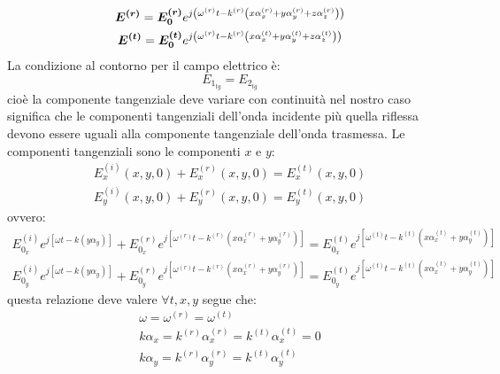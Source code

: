 \begin{subequations}
  \begin{gather}
    \boldsymbol{E^{(r)}}=\boldsymbol{E^{(r)}_0}e^{j\left(\omega^{(r)} t-k^{(r)}\left(x\alpha^{(r)}_x+y\alpha^{(r)}_y+z\alpha^{(r)}_z\right)\right)}\\
    \boldsymbol{E^{(t)}}=\boldsymbol{E^{(t)}_0}e^{j\left(\omega^{(r)} t-k^{(r)}\left(x\alpha^{(t)}_x+y\alpha^{(t)}_y+z\alpha^{(t)}_z\right)\right)}
  \end{gather}
\end{subequations}
La condizione al contorno per il campo elettrico è:
\begin{equation}
  E_{1_{tg}}=E_{2_{tg}}
\end{equation}
cioè la componente tangenziale deve variare con continuità nel nostro caso significa che le componenti tangenziali dell'onda incidente più quella riflessa devono essere uguali alla componente tangenziale dell'onda trasmessa. Le componenti tangenziali sono le componenti $x$ e $y$:
\begin{subequations}
  \begin{gather}
    E_x^{(i)}(x,y,0)+E_x^{(r)}(x,y,0)=E_x^{(t)}(x,y,0)\\
    E_y^{(i)}(x,y,0)+E_y^{(r)}(x,y,0)=E_y^{(t)}(x,y,0)
  \end{gather}
\end{subequations}
ovvero:
\begin{subequations}
  \begin{gather}
    E^{(i)}_{0_x}e^{j\left[\omega t-k\left(y\alpha_y\right)\right]}+E^{(r)}_{0_x}e^{j\left[\omega^{(r)} t-k^{(r)}(x\alpha_x^{(r)}+y\alpha_y^{(r)})\right]}=E^{(t)}_{0_x}e^{j\left[\omega^{(t)} t-k^{(t)}(x\alpha_x^{(t)}+y\alpha_y^{(t)})\right]}\\
    E^{(i)}_{0_y}e^{j\left[\omega t-k\left(y\alpha_y\right)\right]}+E^{(r)}_{0_y}e^{j\left[\omega^{(r)} t-k^{(r)}(x\alpha_x^{(r)}+y\alpha_y^{(r)})\right]}=E^{(t)}_{0_y}e^{j\left[\omega^{(t)} t-k^{(t)}(x\alpha_x^{(t)}+y\alpha_y^{(t)})\right]}
  \end{gather}
  \label{tante_ottica01}
\end{subequations}
questa relazione deve valere $\forall t,x,y$ segue che:
\begin{subequations}
  \begin{gather}
    \label{ottica_frequenze01}
    \omega=\omega^{(r)}=\omega^{(t)}\\
    \label{ottica_normali01}
    k\alpha_x=k^{(r)}\alpha_x^{(r)}=k^{(t)}\alpha_x^{(t)}=0\\
    k\alpha_y=k^{(r)}\alpha_y^{(r)}=k^{(t)}\alpha_y^{(t)}
  \end{gather}
\end{subequations}
